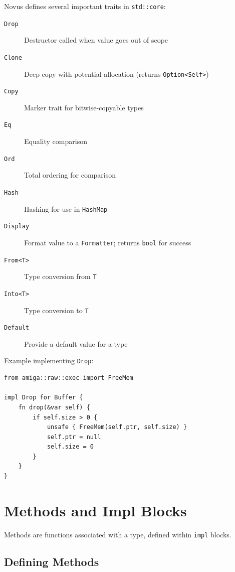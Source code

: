 Novus defines several important traits in \texttt{std::core}:

\begin{description}
    \item[\texttt{Drop}] Destructor called when value goes out of scope
    \item[\texttt{Clone}] Deep copy with potential allocation (returns \texttt{Option<Self>})
    \item[\texttt{Copy}] Marker trait for bitwise-copyable types
    \item[\texttt{Eq}] Equality comparison
    \item[\texttt{Ord}] Total ordering for comparison
    \item[\texttt{Hash}] Hashing for use in \texttt{HashMap}
    \item[\texttt{Display}] Format value to a \texttt{Formatter}; returns \texttt{bool} for success
    \item[\texttt{From<T>}] Type conversion from \texttt{T}
    \item[\texttt{Into<T>}] Type conversion to \texttt{T}
    \item[\texttt{Default}] Provide a default value for a type
\end{description}

Example implementing \texttt{Drop}:

\begin{lstlisting}
from amiga::raw::exec import FreeMem

impl Drop for Buffer {
    fn drop(&var self) {
        if self.size > 0 {
            unsafe { FreeMem(self.ptr, self.size) }
            self.ptr = null
            self.size = 0
        }
    }
}
\end{lstlisting}

\section{Methods and Impl Blocks}
\label{sec:methods}

Methods are functions associated with a type, defined within \texttt{impl} blocks.

\subsection{Defining Methods}
\label{subsec:defining-methods}

